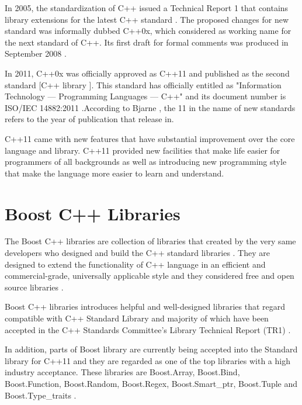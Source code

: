 \documentclass[11pt]{report}
\begin{document}
In 2005, the standardization of C++ issued a Technical Report 1 that contains library extensions for the latest C++ standard \cite{Josuttis:2012:CppStandardLibrary}. The proposed changes for new standard was informally dubbed C++0x, which considered as working name for the next standard of C++. Its first draft for formal comments was produced in September 2008 \cite{CplusplusHistoryofCpp}. 

In 2011, C++0x was officially approved as C++11 and published as the second standard [C++ library ]. This standard has officially entitled as "Information Technology — Programming Languages — C++" and its document number is ISO/IEC 14882:2011 \cite{Josuttis:2012:CppStandardLibrary}.According to Bjarne \cite{Stroustrup:2012:Cpp11}, the 11 in the name of new standards refers to the year of publication that release in.

C++11 came with new features that have substantial improvement over the core language and library. C++11 provided new facilities that make life easier for programmers of all backgrounds as well as introducing new programming style  that make the language more easier to learn and understand.

\section{Boost C++ Libraries}
\label{sec: Boost}
The Boost C++ libraries are collection of libraries that created by the very same developers who designed and build the C++ standard libraries \cite{Schaling:2011:BoostCppLibraries}. They are designed to extend the functionality of C++ language in an efficient and commercial-grade, universally applicable style \cite{Boost:2007:Cpp} and they considered free and open source libraries \cite{Deitel:2012:CPP}.

Boost C++ libraries introduces helpful and well-designed libraries that regard compatible with C++ Standard Library \cite{Deitel:2012:CPP} and majority of which have been accepted in the C++ Standards Committee's Library Technical Report (TR1) \cite{Boost:2007:Cpp}.

In addition, parts of Boost library are currently being accepted into the Standard library for C++11 \cite{Boost:2007:Cpp} and they are regarded as one of the top libraries with a high industry acceptance. These libraries are Boost.Array, Boost.Bind, Boost.Function, Boost.Random, Boost.Regex, Boost.Smart\_ptr, Boost.Tuple and Boost.Type\_traits \cite{Deitel:2012:CPP}.
\end{document}
